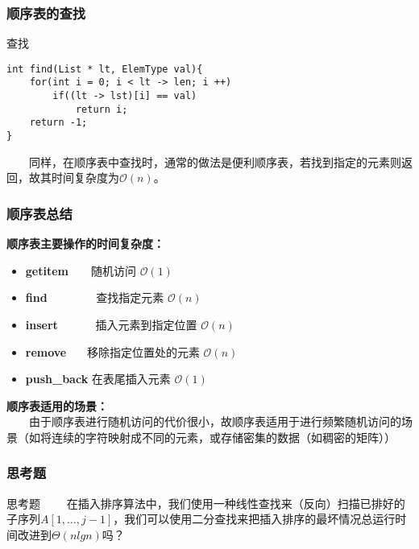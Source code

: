\documentclass{beamer}
\begin{document}
	\begin{frame}[fragile]\frametitle{顺序表的查找}
		\begin{block}{查找}
\begin{verbatim}
int find(List * lt, ElemType val){
    for(int i = 0; i < lt -> len; i ++)
        if((lt -> lst)[i] == val)
            return i;
    return -1;
}
\end{verbatim}
		\end{block}
	\ \ \ \ 同样，在顺序表中查找时，通常的做法是便利顺序表，若找到指定的元素则返回，故其时间复杂度为$\mathcal{O}(n)$。
	\end{frame}

	\begin{frame}\frametitle{顺序表总结}
		\textbf{顺序表主要操作的时间复杂度：}
		\begin{itemize}
			\item \textbf{getitem}\ \ \ \  随机访问 $\mathcal{O}(1)$
			\item \textbf{find} \ \ \ \ \ \ \ \ 查找指定元素 $\mathcal{O}(n)$
			\item \textbf{insert} \ \ \ \ \ \ 插入元素到指定位置 $\mathcal{O}(n)$
			\item \textbf{remove} \ \ \ 移除指定位置处的元素 $\mathcal{O}(n)$
			\item \textbf{push\_back} 在表尾插入元素 $\mathcal{O}(1)$
		\end{itemize} 
		\textbf{顺序表适用的场景：} \\
		\ \ \ \ 由于顺序表进行随机访问的代价很小，故顺序表适用于进行频繁随机访问的场景（如将连续的字符映射成不同的元素，或存储密集的数据（如稠密的矩阵））
	\end{frame}
	\begin{frame}\frametitle{思考题}
		\begin{block}{思考题}
			\ \ \ \ 在插入排序算法中，我们使用一种线性查找来（反向）扫描已排好的子序列$A[1,\dots, j-1]$，我们可以使用二分查找来把插入排序的最坏情况总运行时间改进到$\Theta(nlgn)$吗？
		\end{block}
	\end{frame}
\end{document}
